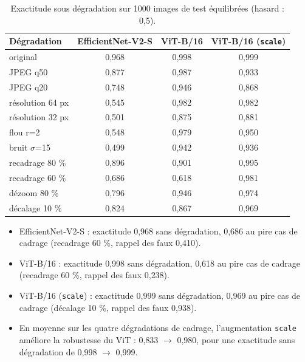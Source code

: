\begin{table}[H]
\centering\small
\begin{tabular}{@{}lccc@{}}
\toprule
\textbf{Dégradation} & \textbf{EfficientNet-V2-S} & \textbf{ViT-B/16} & \textbf{ViT-B/16 (\texttt{scale})} \\
\midrule
original & 0{,}968 & 0{,}998 & 0{,}999 \\
JPEG q50 & 0{,}877 & 0{,}987 & 0{,}933 \\
JPEG q20 & 0{,}748 & 0{,}946 & 0{,}868 \\
résolution 64 px & 0{,}545 & 0{,}982 & 0{,}982 \\
résolution 32 px & 0{,}501 & 0{,}875 & 0{,}881 \\
flou r=2 & 0{,}548 & 0{,}979 & 0{,}950 \\
bruit $\sigma$=15 & 0{,}499 & 0{,}942 & 0{,}936 \\
recadrage 80 \% & 0{,}896 & 0{,}901 & 0{,}995 \\
recadrage 60 \% & 0{,}686 & 0{,}618 & 0{,}981 \\
dézoom 80 \% & 0{,}796 & 0{,}946 & 0{,}974 \\
décalage 10 \% & 0{,}824 & 0{,}867 & 0{,}969 \\
\bottomrule
\end{tabular}
\caption{Exactitude sous dégradation sur 1000 images de test équilibrées (hasard : 0,5).}
\end{table}
\begin{itemize}
\item EfficientNet-V2-S : exactitude 0{,}968 sans dégradation, 0{,}686 au pire cas de cadrage (recadrage 60 \%, rappel des faux 0{,}410).
\item ViT-B/16 : exactitude 0{,}998 sans dégradation, 0{,}618 au pire cas de cadrage (recadrage 60 \%, rappel des faux 0{,}238).
\item ViT-B/16 (\texttt{scale}) : exactitude 0{,}999 sans dégradation, 0{,}969 au pire cas de cadrage (décalage 10 \%, rappel des faux 0{,}938).
\item En moyenne sur les quatre dégradations de cadrage, l'augmentation \texttt{scale} améliore la robustesse du ViT : 0{,}833 $\to$ 0{,}980, pour une exactitude sans dégradation de 0{,}998 $\to$ 0{,}999.
\end{itemize}
